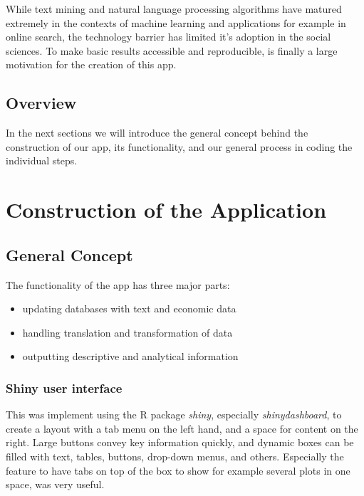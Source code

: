\documentclass[12pt,a4paper]{article}
\begin{document}
While text mining and natural language processing algorithms have
matured extremely in the contexts of machine learning and applications
for example in online search, the technology barrier has limited it's
adoption in the social sciences. To make basic results accessible and
reproducible, is finally a large motivation for the creation of this
app.

\hypertarget{overview}{%
\subsection{Overview}\label{overview}}

In the next sections we will introduce the general concept behind the
construction of our app, its functionality, and our general process in
coding the individual steps.

\hypertarget{construction-of-the-application}{%
\section{Construction of the
Application}\label{construction-of-the-application}}

\hypertarget{general-concept}{%
\subsection{General Concept}\label{general-concept}}

The functionality of the app has three major parts:

\begin{itemize}
\tightlist
\item
  updating databases with text and economic data
\item
  handling translation and transformation of data
\item
  outputting descriptive and analytical information
\end{itemize}

\hypertarget{shiny-user-interface}{%
\subsubsection{Shiny user interface}\label{shiny-user-interface}}

This was implement using the R package \emph{shiny}, especially
\emph{shinydashboard}, to create a layout with a tab menu on the left
hand, and a space for content on the right. Large buttons convey key
information quickly, and dynamic boxes can be filled with text, tables,
buttons, drop-down menus, and others. Especially the feature to have
tabs on top of the box to show for example several plots in one space,
was very useful.
\end{document}
